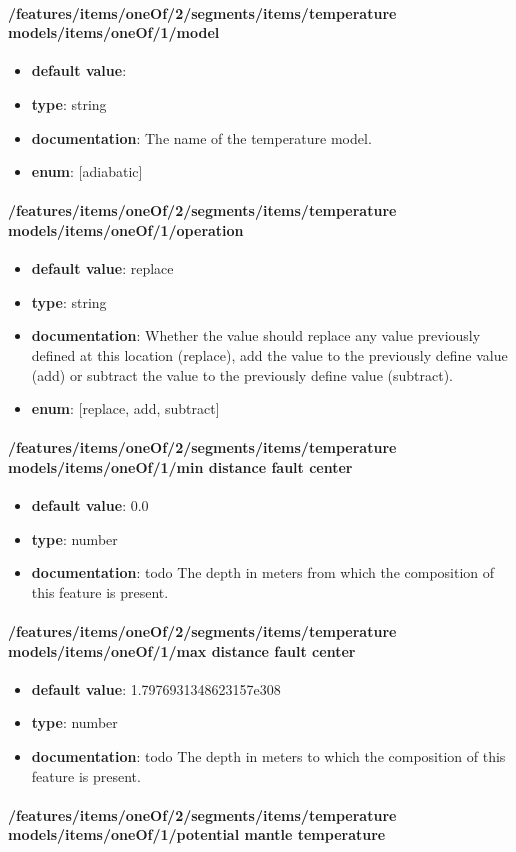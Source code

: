 \paragraph{/features/items/oneOf/2/segments/items/temperature models/items/oneOf/1/model}
\begin{itemize}\item {\bf default value}: 
\item {\bf type}: string
\item {\bf documentation}: The name of the temperature model.
\item {\bf enum}: [adiabatic]\end{itemize}\paragraph{/features/items/oneOf/2/segments/items/temperature models/items/oneOf/1/operation}
\begin{itemize}\item {\bf default value}: replace
\item {\bf type}: string
\item {\bf documentation}: Whether the value should replace any value previously defined at this location (replace), add the value to the previously define value (add) or subtract the value to the previously define value (subtract).
\item {\bf enum}: [replace, add, subtract]\end{itemize}\paragraph{/features/items/oneOf/2/segments/items/temperature models/items/oneOf/1/min distance fault center}
\begin{itemize}\item {\bf default value}: 0.0
\item {\bf type}: number
\item {\bf documentation}: todo The depth in meters from which the composition of this feature is present.
\end{itemize}\paragraph{/features/items/oneOf/2/segments/items/temperature models/items/oneOf/1/max distance fault center}
\begin{itemize}\item {\bf default value}: 1.7976931348623157e308
\item {\bf type}: number
\item {\bf documentation}: todo The depth in meters to which the composition of this feature is present.
\end{itemize}\paragraph{/features/items/oneOf/2/segments/items/temperature models/items/oneOf/1/potential mantle temperature}
